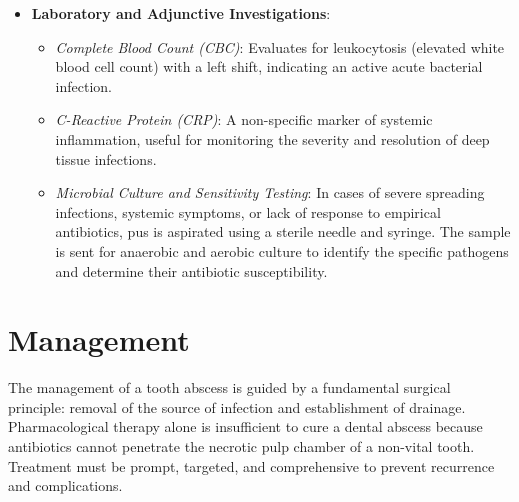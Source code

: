 \begin{itemize}
\begin{itemize}
    \end{itemize}
  \item \textbf{Laboratory and Adjunctive Investigations}:
    \begin{itemize}
      \item \textit{Complete Blood Count (CBC)}: Evaluates for leukocytosis (elevated white blood cell count) with a left shift, indicating an active acute bacterial infection.
      \item \textit{C-Reactive Protein (CRP)}: A non-specific marker of systemic inflammation, useful for monitoring the severity and resolution of deep tissue infections.
      \item \textit{Microbial Culture and Sensitivity Testing}: In cases of severe spreading infections, systemic symptoms, or lack of response to empirical antibiotics, pus is aspirated using a sterile needle and syringe. The sample is sent for anaerobic and aerobic culture to identify the specific pathogens and determine their antibiotic susceptibility.
    \end{itemize}
\end{itemize}

\section*{Management}
The management of a tooth abscess is guided by a fundamental surgical principle: removal of the source of infection and establishment of drainage. Pharmacological therapy alone is insufficient to cure a dental abscess because antibiotics cannot penetrate the necrotic pulp chamber of a non-vital tooth. Treatment must be prompt, targeted, and comprehensive to prevent recurrence and complications.

